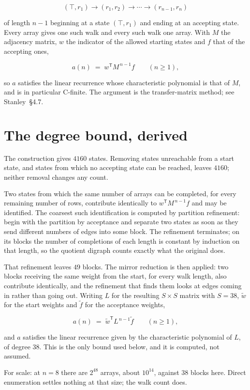 \documentclass[11pt]{article}
\theoremstyle{definition}
\begin{document}
\[(\top,r_1) \to (r_1,r_2) \to \cdots \to (r_{n-1},r_n)\]

of length $n-1$ beginning at a state $(\top,r_1)$ and ending at an accepting state. Every array gives one such walk and every such walk one array. With $M$ the adjacency matrix, $w$ the indicator of the allowed starting states and $f$ that of the accepting ones,

\[a(n) \;=\; w^{\mathsf T} M^{\,n-1} f \qquad (n \ge 1),\]

so $a$ satisfies the linear recurrence whose characteristic polynomial is that of $M$, and is in particular C-finite. The argument is the transfer-matrix method; see Stanley~\S4.7.

\section{The degree bound, derived}

The construction gives $4160$ states. Removing states unreachable from a start state, and states from which no accepting state can be reached, leaves $4160$; neither removal changes any count.

Two states from which the same number of arrays can be completed, for every remaining number of rows, contribute identically to $w^{\mathsf T}M^{\,n-1}f$ and may be identified. The coarsest such identification is computed by partition refinement: begin with the partition by acceptance and separate two states as soon as they send different numbers of edges into some block. The refinement terminates; on its blocks the number of completions of each length is constant by induction on that length, so the quotient digraph counts exactly what the original does.

That refinement leaves $49$ blocks. The mirror reduction is then applied: two blocks receiving the same weight from the start, for every walk length, also contribute identically, and the refinement that finds them looks at edges coming in rather than going out. Writing $L$ for the resulting $S \times S$ matrix with $S = 38$, $\tilde w$ for the start weights and $\tilde f$ for the acceptance weights,

\[a(n) \;=\; \tilde w^{\mathsf T} L^{\,n-1} \tilde f \qquad (n \ge 1),\]

and $a$ satisfies the linear recurrence given by the characteristic polynomial of $L$, of degree $38$. This is the only bound used below, and it is computed, not assumed.

For scale: at $n = 8$ there are $2^{48}$ arrays, about $10^{14}$, against $38$ blocks here. Direct enumeration settles nothing at that size; the walk count does.
\end{document}
